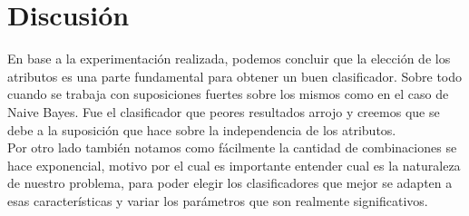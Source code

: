 \section{Discusión}

En base a la experimentación realizada, podemos concluir que la elección de los atributos es una parte fundamental para obtener un buen clasificador. Sobre todo cuando se trabaja con suposiciones fuertes sobre los mismos como en el caso de Naive Bayes. Fue el clasificador que peores resultados arrojo y creemos que se debe a la suposición que hace sobre la independencia de los atributos. \\

Por otro lado también notamos como fácilmente la cantidad de combinaciones se hace exponencial, motivo por el cual es importante entender cual es la naturaleza de nuestro problema, para poder elegir los clasificadores que mejor se adapten a esas características y variar los parámetros que son realmente significativos.




 

